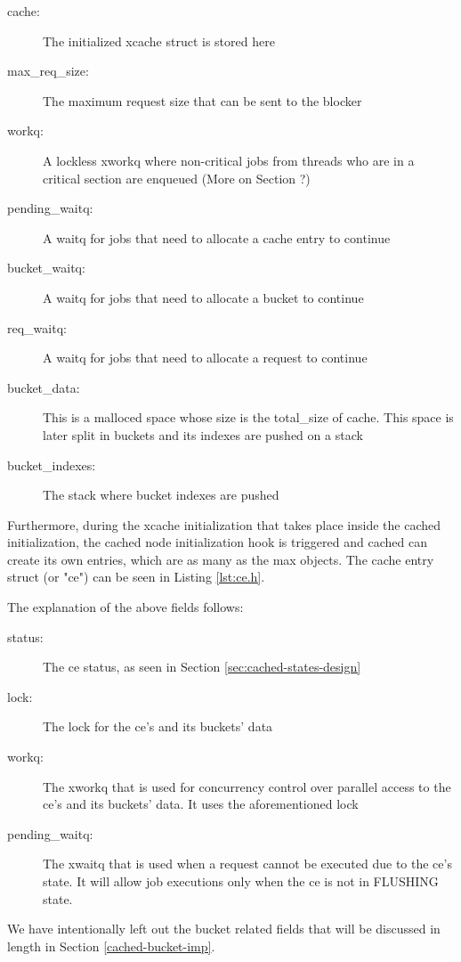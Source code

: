 \begin{description}
	\item[cache:]
		The initialized xcache struct is stored here
	\item[max\_req\_size:]
		The maximum request size that can be sent to the blocker
	\item[workq:]
		A lockless xworkq where non-critical jobs from threads who are in a 
		critical section are enqueued (More on Section ?)
	\item[pending\_waitq:]
		A waitq for jobs that need to allocate a cache entry to continue
	\item[bucket\_waitq:]
		A waitq for jobs that need to allocate a bucket to continue
	\item[req\_waitq:]
		A waitq for jobs that need to allocate a request to continue
	\item[bucket\_data:]
		This is a malloced space whose size is the total\_size of cache. This 
		space is later split in buckets and its indexes are pushed on a stack
	\item[bucket\_indexes:]
		The stack where bucket indexes are pushed
\end{description}

Furthermore, during the xcache initialization that takes place inside the 
cached initialization, the cached node initialization hook is triggered and 
cached can create its own entries, which are as many as the max objects. The 
cache entry struct (or "ce") can be seen in Listing \ref{lst:ce.h}.


The explanation of the above fields follows:

\begin{description}
	\item[status:] The ce status, as seen in Section 
		\ref{sec:cached-states-design}
	\item[lock:] The lock for the ce's and its buckets' data
	\item[workq:] The xworkq that is used for concurrency control over 
		parallel access to the ce's and its buckets' data. It uses the 
		aforementioned lock
	\item[pending\_waitq:] The xwaitq that is used when a request cannot be 
		executed due to the ce's state. It will allow job executions 
		only when the ce is not in FLUSHING state.
\end{description}

We have intentionally left out the bucket related fields that will be discussed 
in length in Section \ref{cached-bucket-imp}.

